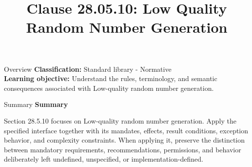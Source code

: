 \documentclass[10pt,letterpaper]{article}
\title{Clause 28.05.10: Low Quality Random Number Generation}
\author{}
\date{}
\begin{document}
\maketitle
\begin{CornellOverviewBox}{Overview}
\textbf{Classification:} Standard library - Normative\\[2pt]
\textbf{Learning objective:} Understand the rules, terminology, and semantic consequences associated with Low-quality random number generation.
\end{CornellOverviewBox}\begin{CornellSummaryBox}{Summary}
{\sffamily\bfseries\color{Accent} Summary}\par\vspace{3pt}Section 28.5.10 focuses on Low-quality random number generation. Apply the specified interface together with its mandates, effects, result conditions, exception behavior, and complexity constraints. When applying it, preserve the distinction between mandatory requirements, recommendations, permissions, and behavior deliberately left undefined, unspecified, or implementation-defined.
\end{CornellSummaryBox}
\end{document}
